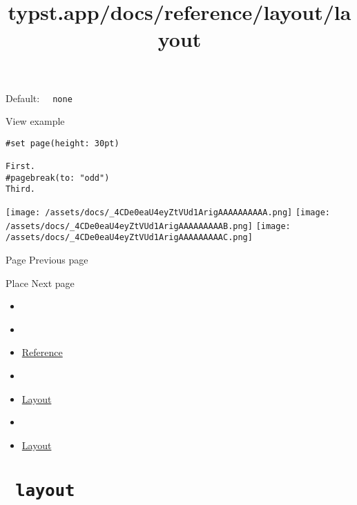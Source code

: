 Default: \texttt{\ }{\texttt{\ none\ }}\texttt{\ }


View example

\begin{verbatim}
#set page(height: 30pt)

First.
#pagebreak(to: "odd")
Third.
\end{verbatim}

\texttt{[image: /assets/docs/\_4CDe0eaU4eyZtVUd1ArigAAAAAAAAAA.png]}
\texttt{[image: /assets/docs/\_4CDe0eaU4eyZtVUd1ArigAAAAAAAAAB.png]}
\texttt{[image: /assets/docs/\_4CDe0eaU4eyZtVUd1ArigAAAAAAAAAC.png]}

\href{/docs/reference/layout/page/}{\pandocbounded{}}

{ Page } { Previous page }

\href{/docs/reference/layout/place/}{\pandocbounded{}}

{ Place } { Next page }


\title{typst.app/docs/reference/layout/layout}

\begin{itemize}
\tightlist
\item
  \href{/docs}{}
\item
  
\item
  \href{/docs/reference/}{Reference}
\item
  
\item
  \href{/docs/reference/layout/}{Layout}
\item
  
\item
  \href{/docs/reference/layout/layout/}{Layout}
\end{itemize}

\section{\texorpdfstring{\texttt{\ layout\ }}{ layout }}\label{summary}

